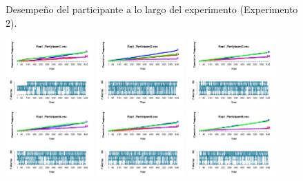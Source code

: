 \begin{figure}[th]
\caption[Aciertos y Errores a lo largo del tiempo; Experimento 2]{Desempeño del participante a lo largo del experimento (Experimento 2).}
\label{fig:Success_E2}
\end{figure}

\begin{figure}[th]
\centering
\includegraphics[width=0.30\textwidth]{Figures/Outcome_Exp1_P1} \includegraphics[width=0.30\textwidth]{Figures/Outcome_Exp1_P2} \includegraphics[width=0.30\textwidth]{Figures/Outcome_Exp1_P3}
\includegraphics[width=0.30\textwidth]{Figures/Outcome_Exp1_P4} \includegraphics[width=0.30\textwidth]{Figures/Outcome_Exp1_P5} \includegraphics[width=0.30\textwidth]{Figures/Outcome_Exp1_P6}

\end{figure}
